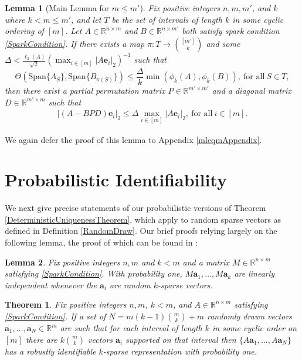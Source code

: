 \documentclass[journal, onecolumn]{IEEEtran}
\newtheorem{theorem}{Theorem}
\newtheorem{lemma}{Lemma}
\begin{document}
\begin{lemma}[Main Lemma for $m \leq m'$]\label{MainLemma2}
Fix positive integers $n, m, m'$, and $k$ where $k < m \leq m'$, and let $T$ be the set of intervals of length $k$ in some cyclic ordering of $[m]$. Let $A \in \mathbb{R}^{n \times m}$ and $B \in \mathbb{R}^{n \times m'}$ both satisfy spark condition \eqref{SparkCondition}. If there exists a map $\pi: T \to {[m'] \choose k}$ and some $\Delta < \frac{\ell_{2}(A)}{\sqrt{2}} (\max_{i \in [m]}|A\mathbf{e}_i|_2)^{-1}$ such that 
\begin{equation}\label{GapUpperBound2}
\Theta(\text{Span}\{A_{S}\}, \text{Span}\{B_{\pi(S)}\}) \leq \frac{ \Delta }{k} \min(\phi_k(A), \phi_k(B)), \ \text{for all} \ S \in T,
\end{equation}
%
then there exist a partial permutation matrix $P \in \mathbb{R}^{m' \times m'}$ and a diagonal matrix $D \in \mathbb{R}^{m' \times m}$ such that
\begin{align}
|(A - BPD)\mathbf{e}_i|_2 \leq \Delta \max_{i \in [m]}|A\mathbf{e}_i|_2, \ \text{for all} \ i \in [m].
\end{align}
\end{lemma}

We again defer the proof of this lemma to Appendix \ref{mleqmAppendix}.



\section{Probabilistic Identifiability}\label{PUT}

We next give precise statements of our probabilistic versions of Theorem \ref{DeterministicUniquenessTheorem}, which apply to random sparse vectors as defined in Definition \ref{RandomDraw}. Our brief proofs relying largely on the following lemma, the proof of which can be found in \cite[Lemma 3]{Hillar15}:
\begin{lemma}\label{Hillar15lemma2}
Fix positive integers $n, m$ and $k < m$ and a matrix $M \in \mathbb{R}^{n \times m}$ satisfying \eqref{SparkCondition}. With probability one, $M\mathbf{a}_1, \ldots, M\mathbf{a}_k$ are linearly independent whenever the $\mathbf{a}_i$ are random $k$-sparse vectors.
\end{lemma}

\begin{theorem}\label{Theorem2}
Fix positive integers $n, m$, $k < m$, and $A \in \mathbb{R}^{n \times m}$ satisfying \eqref{SparkCondition}. If a set of $N = m(k-1){m \choose k}+m$ randomly drawn vectors $\mathbf{a}_1, \ldots, \mathbf{a}_N \in \mathbb{R}^m$ are such that for each interval of length $k$ in some cyclic order on $[m]$ there are $k{m \choose k}$ vectors $\mathbf{a}_i$ supported on that interval then $\{A\mathbf{a}_1, \ldots, A\mathbf{a}_N\}$ has a robustly identifiable $k$-sparse representation with probability one.
\end{theorem}
\end{document}
